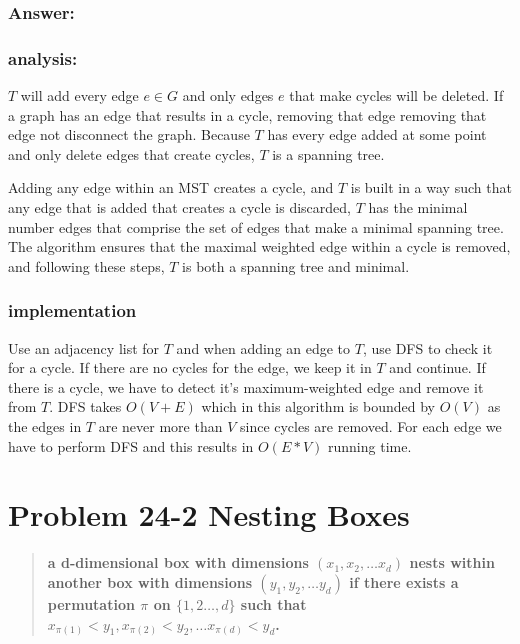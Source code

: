 \documentclass[titlepage]{article}
\theoremstyle{definition}
\begin{document}
  \subsubsection{Answer:}
  \subsubsection{analysis:}
    $T$ will add every edge $e \in G$ and only edges $e$ that make cycles will
    be deleted. If a graph has an edge that results in a cycle, removing that
    edge removing that edge not disconnect the graph. Because $T$ has every
    edge added at some point and only delete edges that create cycles, $T$ is a
    spanning tree. 

    Adding any  edge within an MST creates a cycle, and $T$ is built in a way
    such that any edge that is added that creates a cycle is discarded, $T$ has
    the minimal number edges that comprise the set of edges that make a minimal
    spanning tree. The algorithm ensures that the maximal weighted edge within
    a cycle is removed, and following these steps, $T$ is both a spanning tree
    and minimal. 

  \subsubsection{implementation}
  Use an adjacency list for $T$ and when adding an edge to $T$, use DFS to
  check it for a cycle. If there are no cycles for the edge, we keep it in 
  $T$ and continue. If there is a cycle, we have to detect it's
  maximum-weighted edge and remove it from $T$. DFS takes $O(V+E)$ which in
  this algorithm is bounded by $O(V)$ as the edges in $T$ are never more than
  $V$ since cycles are removed. For each edge we have to perform DFS and this
  results in $O(E*V)$ running time. 



\section{Problem 24-2 Nesting Boxes}
  \begin{quote}
    \textbf{a d-dimensional box with dimensions $(x_1, x_2, \dots x_d)$
    \textbf{nests} within another box with dimensions $(y_1, y_2, \dots y_d)$
    if there exists a permutation $\pi$ on $\{1,2\dots,d\}$ such that 
    $ x_{\pi(1)} < y_1, x_{\pi(2)} < y_2, \dots x_{\pi(d)} < y_d$.  }
  \end{quote}
\end{document}
